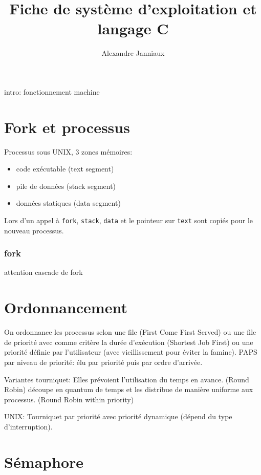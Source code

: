 \documentclass[a4paper]{article}
\title{Fiche de système d'exploitation et langage C}
\author{Alexandre Janniaux}
\begin{document}
\maketitle

\begin{multicols*}{2}

    intro: fonctionnement machine

    \section{Fork et processus}

    Processus sous {UNIX}, 3 zones mémoires:
    \begin{itemize}
        \item code exécutable (text segment)
        \item pile de données (stack segment)
        \item données statiques (data segment)
    \end{itemize}

    Lors d'un appel à \texttt{fork}, \texttt{stack}, \texttt{data} et le pointeur sur \texttt{text} sont copiés pour le nouveau processus.

    \subsubsection{fork}
    attention cascade de fork

    \section{Ordonnancement}

    On ordonnance les processus selon une file (First Come First Served) ou une file de priorité avec comme critère la durée d'exécution (Shortest Job First) ou une priorité définie par l'utilisateur (avec vieillissement pour éviter la famine).
    PAPS par niveau de priorité: élu par priorité puis par ordre d'arrivée.

    Variantes tourniquet: Elles prévoient l'utilisation du temps en avance.
    (Round Robin) découpe en quantum de temps et les distribue de manière uniforme aux processus.
    (Round Robin within priority)

    {UNIX}: Tourniquet par priorité avec priorité dynamique (dépend du type d'interruption).


    \section{Sémaphore}


\end{multicols*}
\end{document}
